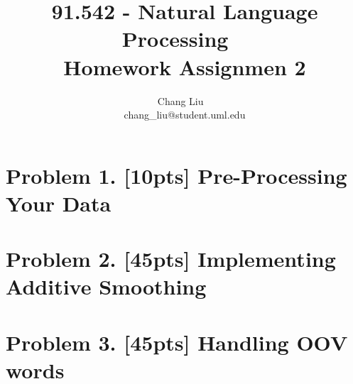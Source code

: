 \documentclass{article}
\title{91.542 - Natural Language Processing ~\\ Homework Assignmen 2}
\author{Chang Liu ~\\ chang\_liu@student.uml.edu}
\begin{document}
\maketitle


\section{Problem 1. [10pts] Pre-Processing Your Data}

\section{Problem 2. [45pts] Implementing Additive Smoothing}


\section{Problem 3. [45pts] Handling OOV words}
\end{document}
